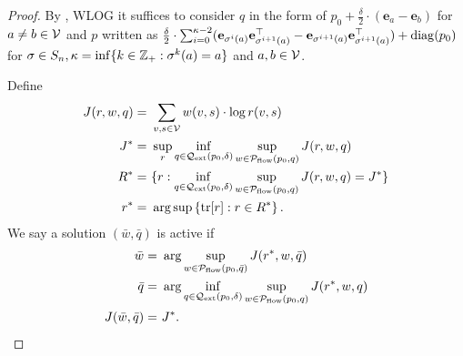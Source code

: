 \begin{proof}

By , WLOG it suffices to consider $q$ in the form of $p_0 + \frac{\delta}{2}\cdot (\mathbf{e}_a - \mathbf{e}_b)$ for $a \neq b \in \mathcal{V}$ and $p$ written as $\frac{\delta}{2} \cdot \sum_{i=0}^{\kappa-2} (\mathbf{e}_{\sigma^{i}(a)}\mathbf{e}_{\sigma^{i+1}(a)}^\top - \mathbf{e}_{\sigma^{i+1}(a)}\mathbf{e}_{\sigma^{i+1}(a)}^\top) + \mathrm{diag}(p_0)$ for $\sigma \in S_n, \kappa = \inf \{k \in \mathbb{Z}_+: \sigma^k(a) = a\}$ and $a,b \in \mathcal{V}$.

Define
\begin{align*}
    J(r,w,q) = &~ \sum_{v,s \in \mathcal{V}} w(v,s) \cdot \log r(v,s)\\
    J^* = &~ \sup_{r} \inf_{q \in \mathcal{Q}_{\text{ext}}(p_0,\delta)} \sup_{w \in \mathcal{P}_{\mathrm{flow}}(p_0,q)} J(r,w,q)\\
    R^* = &~ \{r: \inf_{q \in \mathcal{Q}_{\text{ext}}(p_0,\delta)} \sup_{w \in \mathcal{P}_{\mathrm{flow}}(p_0,q)} J(r,w,q) = J^*\}\\
    r^* = &~ \arg\sup\left\{\mathrm{tr}[r]: r \in R^* \right\}.
\end{align*}
We say a solution $(\bar w,\bar q)$ is active if 
\begin{align*}
    \bar w = &~ \arg\sup_{w \in \mathcal{P}_{\mathrm{flow}}(p_0,\bar q)} J(r^*, w,\bar q)\\
    \bar q = &~ \arg\inf_{q \in \mathcal{Q}_{\text{ext}}(p_0,\delta)} \sup_{w \in \mathcal{P}_{\mathrm{flow}}(p_0,q)} J(r^*,w,q)\\
    J(\bar w,\bar q) = &~ J^*.
\end{align*}


\end{proof}
